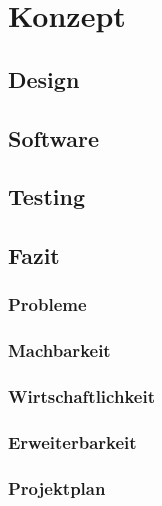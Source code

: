 \chapter{Konzept}

\label{ReportKonzept}



\section{Design}

\section{Software}

\section{Testing}

\section{Fazit}

\subsection{Probleme}


\subsection{Machbarkeit}


\subsection{Wirtschaftlichkeit}


\subsection{Erweiterbarkeit}


\subsection{Projektplan}
